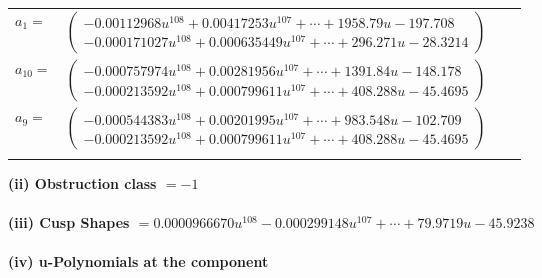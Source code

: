 \documentclass[1p]{elsarticle_modified}
\theoremstyle{definition}
\begin{document}
\begin{tabular}{m{7pt} m{180pt} m{7pt} m{180pt} }
\flushright $a_{1}=$&$\begin{pmatrix}-0.00112968 u^{108}+0.00417253 u^{107}+\cdots+1958.79 u-197.708\\-0.000171027 u^{108}+0.000635449 u^{107}+\cdots+296.271 u-28.3214\end{pmatrix}$ \\
\flushright $a_{10}=$&$\begin{pmatrix}-0.000757974 u^{108}+0.00281956 u^{107}+\cdots+1391.84 u-148.178\\-0.000213592 u^{108}+0.000799611 u^{107}+\cdots+408.288 u-45.4695\end{pmatrix}$ \\
\flushright $a_{9}=$&$\begin{pmatrix}-0.000544383 u^{108}+0.00201995 u^{107}+\cdots+983.548 u-102.709\\-0.000213592 u^{108}+0.000799611 u^{107}+\cdots+408.288 u-45.4695\end{pmatrix}$\\&\end{tabular}
\flushleft \textbf{(ii) Obstruction class $= -1$}\\~\\
\flushleft \textbf{(iii) Cusp Shapes $= 0.0000966670 u^{108}-0.000299148 u^{107}+\cdots+79.9719 u-45.9238$}\\~\\
\newpage\renewcommand{\arraystretch}{1}
\flushleft \textbf{(iv) u-Polynomials at the component}\newline \\
\end{document}
